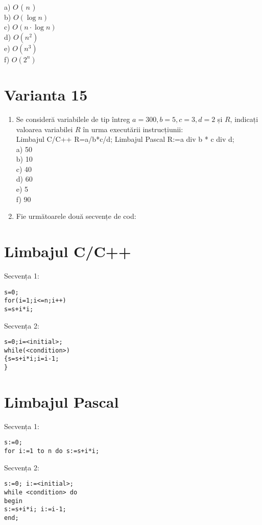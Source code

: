 a) $O$ ( $n$ )\\
b) $O(\log n)$\\
c) $O(n \cdot \log n)$\\
d) $O\left(n^{2}\right)$\\
e) $O\left(n^{3}\right)$\\
f) $O\left(2^{n}\right)$

\section*{Varianta 15}
\begin{enumerate}
  \item Se consideră variabilele de tip întreg $a=300, b=5, c=3, d=2$ și $R$, indicați valoarea variabilei $R$ în urma executării instrucțiunii:\\
Limbajul C/C++ R=a/b*c/d; Limbajul Pascal R:=a div b * c div d;\\
a) 50\\
b) 10\\
c) 40\\
d) 60\\
e) 5\\
f) 90
  \item Fie următoarele două secvențe de cod:
\end{enumerate}

\section*{Limbajul C/C++}
Secvența 1:

\begin{verbatim}
s=0;
for(i=1;i<=n;i++)
s=s+i*i;
\end{verbatim}

Secvența 2:

\begin{verbatim}
s=0;i=<initial>;
while(<condition>)
{s=s+i*i;i=i-1;
}
\end{verbatim}

\section*{Limbajul Pascal}
Secvența 1:

\begin{verbatim}
s:=0;
for i:=1 to n do s:=s+i*i;
\end{verbatim}

Secvența 2:

\begin{verbatim}
s:=0; i:=<initial>;
while <condition> do
begin
s:=s+i*i; i:=i-1;
end;
\end{verbatim}

